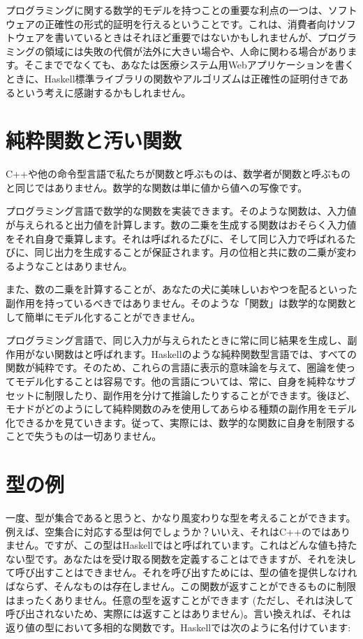 プログラミングに関する数学的モデルを持つことの重要な利点の一つは、ソフトウェアの正確性の形式的証明を行えるということです。これは、消費者向けソフトウェアを書いているときはそれほど重要ではないかもしれませんが、プログラミングの領域には失敗の代償が法外に大きい場合や、人命に関わる場合があります。そこまででなくても、あなたは医療システム用Webアプリケーションを書くときに、Haskell標準ライブラリの関数やアルゴリズムは正確性の証明付きであるという考えに感謝するかもしれません。

\section{純粋関数と汚い関数}

C++や他の命令型言語で私たちが関数と呼ぶものは、数学者が関数と呼ぶものと同じではありません。数学的な関数は単に値から値への写像です。

プログラミング言語で数学的な関数を実装できます。そのような関数は、入力値が与えられると出力値を計算します。数の二乗を生成する関数はおそらく入力値をそれ自身で乗算します。それは呼ばれるたびに、そして同じ入力で呼ばれるたびに、同じ出力を生成することが保証されます。月の位相と共に数の二乗が変わるようなことはありません。

また、数の二乗を計算することが、あなたの犬に美味しいおやつを配るといった副作用を持っているべきではありません。そのような「関数」は数学的な関数として簡単にモデル化することができません。

プログラミング言語で、同じ入力が与えられたときに常に同じ結果を生成し、副作用がない関数はと呼ばれます。Haskellのような純粋関数型言語では、すべての関数が純粋です。そのため、これらの言語に表示的意味論を与えて、圏論を使ってモデル化することは容易です。他の言語については、常に、自身を純粋なサブセットに制限したり、副作用を分けて推論したりすることができます。後ほど、モナドがどのようにして純粋関数のみを使用してあらゆる種類の副作用をモデル化できるかを見ていきます。従って、実際には、数学的な関数に自身を制限することで失うものは一切ありません。

\section{型の例}

一度、型が集合であると思うと、かなり風変わりな型を考えることができます。例えば、空集合に対応する型は何でしょうか？いいえ、それはC++のではありません。ですが、この型はHaskellではと呼ばれています。これはどんな値も持たない型です。あなたはを受け取る関数を定義することはできますが、それを決して呼び出すことはできません。それを呼び出すためには、型の値を提供しなければならず、そんなものは存在しません。この関数が返すことができるものに制限はまったくありません。任意の型を返すことができます (ただし、それは決して呼び出されないため、実際には返すことはありません)。言い換えれば、それは返り値の型において多相的な関数です。Haskellでは次のように名付けています: 

